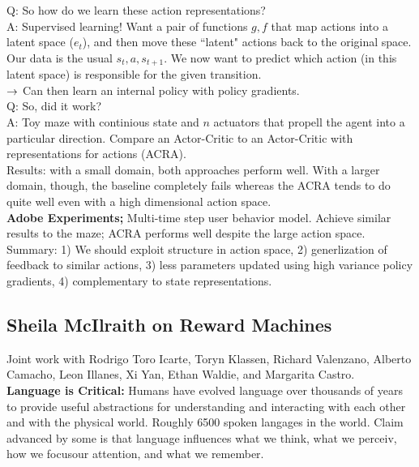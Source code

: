 Q: So how do we learn these action representations? \\

A: Supervised learning! Want a pair of functions $g,f$ that map actions into a latent space ($e_t$), and then move these ``latent" actions back to the original space. Our data is the usual $s_t, a, s_{t+1}$. We now want to predict which action (in this latent space) is responsible for the given transition. \\

$\rightarrow$ Can then learn an internal policy with policy gradients. \\

Q: So, did it work? \\

A: Toy maze with continious state and $n$ actuators that propell the agent into a particular direction. Compare an Actor-Critic to an Actor-Critic with representations for actions (ACRA). \\

Results: with a small domain, both approaches perform well. With a larger domain, though, the baseline completely fails whereas the ACRA tends to do quite well even with a high dimensional action space. \\

{\bf Adobe Experiments;} Multi-time step user behavior model. Achieve similar results to the maze; ACRA performs well despite the large action space. \\

Summary: 1) We should exploit structure in action space, 2) generlization of feedback to similar actions, 3) less parameters updated using high variance policy gradients, 4) complementary to state representations. \\

\spacerule

\subsection{Sheila McIlraith on Reward Machines}
\label{sec:rm}

Joint work with Rodrigo Toro Icarte, Toryn Klassen, Richard Valenzano, Alberto Camacho, Leon Illanes, Xi Yan, Ethan Waldie, and Margarita Castro. \\

{\bf Language is Critical:} Humans have evolved language over thousands of years to provide useful abstractions for understanding and interacting with each other and with the physical world. Roughly 6500 spoken langages in the world. Claim advanced by some is that language influences what we think, what we perceiv, how we focusour attention, and what we remember. \\

